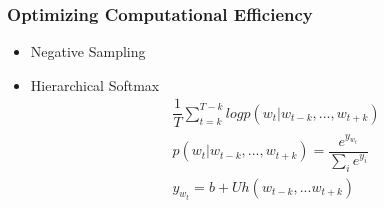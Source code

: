 \documentclass[notheorems]{beamer}
\begin{document}
\begin{frame}
\frametitle{Optimizing Computational Efficiency}
\begin{itemize}
\item Negative Sampling
\item Hierarchical Softmax
\begin{equation}
\begin{aligned}
& \dfrac{1}{T}\sum_{t=k}^{T-k}logp(w_{t}|w_{t-k},...,w_{t+k})\\
& p(w_{t}|w_{t-k},...,w_{t+k})=\dfrac{e^{y_{w_{t}}}}{\sum_{i}e^{y_{i}}}\\
& y_{w_{t}}=b + Uh(w_{t-k},...w_{t+k})
\end{aligned}
\end{equation}
\end{itemize}

\end{frame}
\end{document}

